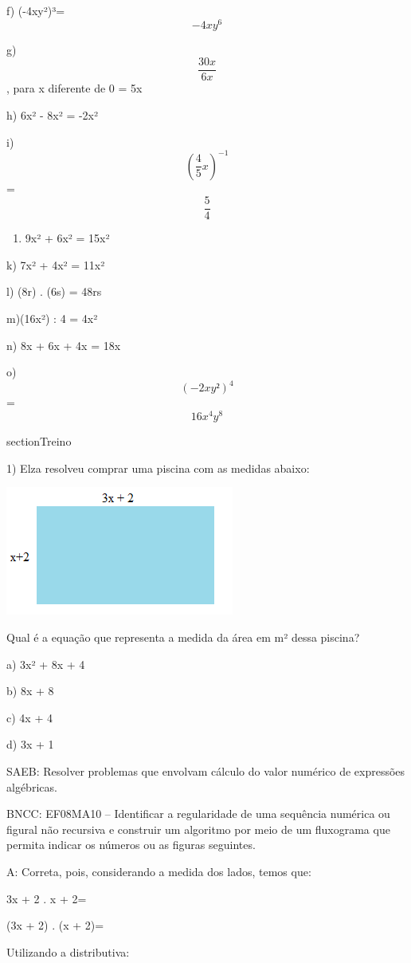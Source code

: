 f) (-4xy²)³= \[-4xy^6\]

g) \[\frac{30x}{6x}\], para x diferente de 0 = 5x

h) 6x² - 8x² = -2x²

i)\[(\frac{4}{5}x)^{-1}\] = \[\frac{5}{4}\]

\begin{enumerate}
\def\labelenumi{\alph{enumi})}
\setcounter{enumi}{9}
\tightlist
\item
  9x² + 6x² = 15x²
\end{enumerate}

k) 7x² + 4x² = 11x²

l) (8r) . (6s) = 48rs

m)(16x²) : 4 = 4x²

n) 8x + 6x + 4x = 18x

o) \[(-2xy²)^4\]= \[16x^4 y^8\]

section{Treino}

1) Elza resolveu comprar uma piscina com as medidas abaixo:

\includegraphics[width=2.9625in,height=1.67014in]{./imgSAEB_8_MAT/media/image6.png}

Qual é a equação que representa a medida da área em m² dessa piscina?

a) 3x² + 8x + 4

b) 8x + 8

c) 4x + 4

d) 3x + 1

SAEB: Resolver problemas que envolvam cálculo do valor numérico de
expressões algébricas.

BNCC: EF08MA10 -- Identificar a regularidade de uma sequência numérica
ou figural não recursiva e construir um algoritmo por meio de um
fluxograma que permita indicar os números ou as figuras seguintes.

A: Correta, pois, considerando a medida dos lados, temos que:

3x + 2 . x + 2=

(3x + 2) . (x + 2)=

Utilizando a distributiva:

